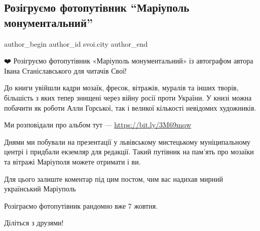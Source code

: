  
 
 
 
 

\subsection{Розігруємо фотопутівник \enquote{Маріуполь монументальний}}
\label{sec:05_10_2022.fb.svoi.city.1.roz_gru_mo_fotoput_v}

\ifcmt
 author_begin
   author_id svoi.city
 author_end
\fi

❤️ Розігруємо фотопутівник «Маріуполь монументальний» із автографом автора Івана
Станіславського для читачів Свої! 

До книги увійшли кадри мозаїк, фресок, вітражів, муралів та інших творів,
більшість з яких тепер знищені через війну росії проти України. У книзі можна
побачити як роботи Алли Горської, так і великої кількості невідомих художників.

Ми розповідали про альбом тут — \url{https://bit.ly/3M69mqw}

Днями ми побували на презентації у львівському мистецькому муніципальному
центрі і придбали екземляр для редакції. Такий путівник на пам'ять про мозаїки
та вітражі Маріуполя можете отримати і ви. 

Для цього залиште коментар під цим постом, чим вас надихав мирний український
Маріуполь 💙 💛

Розіграємо фотопутівник рандомно вже 7 жовтня.

Діліться з друзями!

